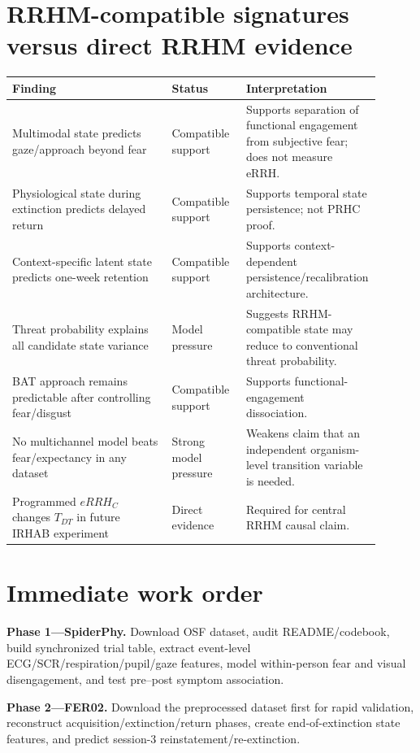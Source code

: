 \documentclass[11pt]{article}
\begin{document}
\section{RRHM-compatible signatures versus direct RRHM evidence}

\begin{longtable}{p{0.43\linewidth}p{0.20\linewidth}p{0.27\linewidth}}
\toprule
Finding & Status & Interpretation \\
\midrule
Multimodal state predicts gaze/approach beyond fear & Compatible support & Supports separation of functional engagement from subjective fear; does not measure eRRH. \\
Physiological state during extinction predicts delayed return & Compatible support & Supports temporal state persistence; not PRHC proof. \\
Context-specific latent state predicts one-week retention & Compatible support & Supports context-dependent persistence/recalibration architecture. \\
Threat probability explains all candidate state variance & Model pressure & Suggests RRHM-compatible state may reduce to conventional threat probability. \\
BAT approach remains predictable after controlling fear/disgust & Compatible support & Supports functional-engagement dissociation. \\
No multichannel model beats fear/expectancy in any dataset & Strong model pressure & Weakens claim that an independent organism-level transition variable is needed. \\
Programmed $eRRH_C$ changes $T_{DT}$ in future IRHAB experiment & Direct evidence & Required for central RRHM causal claim. \\
\bottomrule
\end{longtable}

\section{Immediate work order}

\textbf{Phase 1---SpiderPhy.} Download OSF dataset, audit README/codebook, build synchronized trial table, extract event-level ECG/SCR/respiration/pupil/gaze features, model within-person fear and visual disengagement, and test pre--post symptom association.

\textbf{Phase 2---FER02.} Download the preprocessed dataset first for rapid validation, reconstruct acquisition/extinction/return phases, create end-of-extinction state features, and predict session-3 reinstatement/re-extinction.
\end{document}

